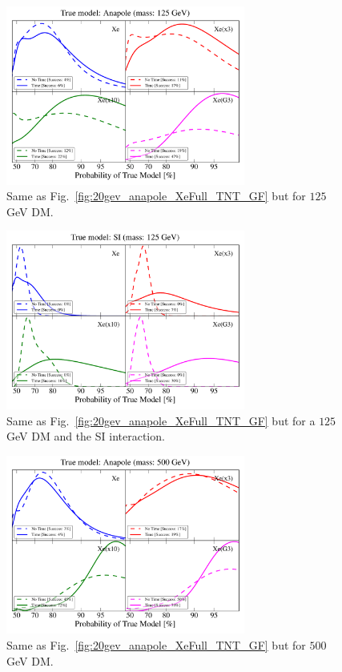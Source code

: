 \documentclass[11pt]{article}
\begin{document}
\begin{figure}
\centering
\includegraphics[width=0.7\textwidth]{plots/PDF_125GeV_Anapole_50sims_Xe_Xe3x_Xe10x_XeG3_GF_TNT.pdf}
\caption{\label{fig:125gev_anapole_XeFull_TNT_GF}
Same as Fig.~\ref{fig:20gev_anapole_XeFull_TNT_GF} but for $125$ GeV DM.}
\end{figure}

\begin{figure}
\centering
\includegraphics[width=0.7\textwidth]{plots/PDF_125GeV_SI_Higgs_50sims_Xe_Xe3x_Xe10x_XeG3_GF_TNT.pdf}
\caption{\label{fig:125gev_SI_Higgs_XeFull_TNT_GF}
Same as Fig.~\ref{fig:20gev_anapole_XeFull_TNT_GF} but for a $125$ GeV DM and the SI interaction.}
\end{figure}


\begin{figure}
\centering
\includegraphics[width=0.7\textwidth]{plots/PDF_500GeV_Anapole_50sims_Xe_Xe3x_Xe10x_XeG3_GF_TNT.pdf}
\caption{\label{fig:500gev_anapole_XeFull_TNT_GF}
Same as Fig.~\ref{fig:20gev_anapole_XeFull_TNT_GF} but for $500$ GeV DM.}
\end{figure}
\end{document}
